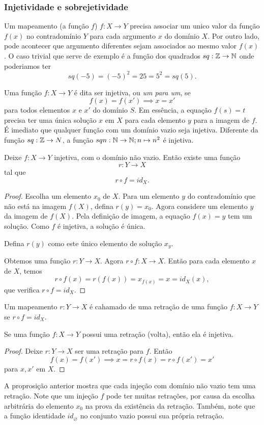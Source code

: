 \subsubsection{Injetividade e sobrejetividade}
Um mapeamento (a função $f$) $f: X \to Y$ precisa associar um unico valor da função $f(x)$ no contradomínio $Y$ para cada argumento $x$ do domínio $X$. Por outro lado, pode acontecer que argumento diferentes sejam associados ao mesmo valor $f(x)$. O caso trivial que serve de exemplo é a função dos quadrados $sq: \mathbb{Z} \to \mathbb{N}$ onde poderiamos ter $$sq(-5) = (-5)^{2} = 25 = 5^{2} = sq(5).$$
\begin{definition}
	Uma função $f: X \to Y$ é dita ser injetiva, ou \emph{um para um}, se $$f(x) = f(x') \implies x = x'$$
  para todos elementos $x$ e $x'$ do domínio $S$.
  Em essência, a equação $f(s) = t$ precisa ter uma única solução $x$ em $X$ para cada elemento $y$ para a imagem de $f$. É imediato que qualquer função com um domínio vazio seja injetiva. Diferente da função $sq: \mathbb{Z} \to N$, a função $sqn: \mathbb{N} \to \mathbb{N}; n \mapsto n^{2}$ é injetiva.
\end{definition}
\begin{stat}
  Deixe $f: X \to Y$ injetiva, com o domínio não vazio. Então existe uma função $$r: Y \to X$$
  tal que $$r \circ f = id_{X}.$$
\end{stat}
\begin{proof}
  Escolha um elemento $x_{0}$ de $X$. Para um elemento $y$ do contradomínio que
  não está na imagem $f(X)$, defina $r(y) = x_{0}$. Agora considere um elemento $y$ da imagem de $f(X)$. Pela definição de imagem, a equação $f(x) = y$ tem um solução. Como $f$ é injetiva, a solução é única. 
  
  Defina $r(y)$ como este único elemento de solução $x_{y}$. 
  
  Obtemos uma função $r: Y \to X$. Agora $r \circ f: X \to X$. Então para cada elemento $x$ de $X$, temos $$r\circ f(x) = r \left(f(x)\right) = x_{f(x)} = x = id_{X}(x),$$ que verifica $r \circ f = id_{X}.$
\end{proof}
\begin{definition}[Retração]
  Um mapeamento $r: Y \to X$ é cahamado de uma retração de uma função $f: X \to Y$ se $r\circ f = id_{X}.$
\end{definition}
\begin{stat}
  Se uma função $f: X \to Y$ possui uma retração (volta), então ela é injetiva.
\end{stat}
\begin{proof}
  Deixe $r: Y \to X$ ser uma retração para $f$. Então $$f(x) = f(x') \implies x=r\circ f(x) = r\circ f(x') = x'$$ para $x,x'$ em $X$.
\end{proof}
A proprosição anterior mostra que cada injeção com domínio não vazio tem uma retração. Note que um injeção $f$ pode ter muitas retrações, por causa da escolha arbitrária do elemento $x_{0}$ na prova da existência da retração. Também, note que a função identidade $id_{\varnothing}$ no conjunto vazio possui sua própria retração.

